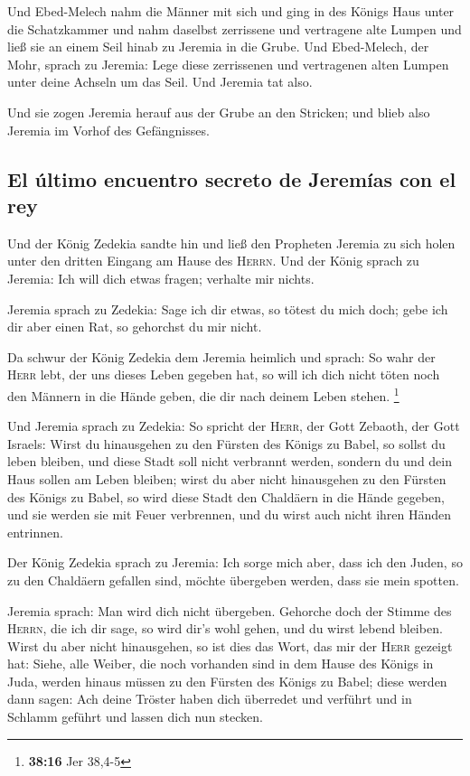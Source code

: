  Und Ebed-Melech nahm die Männer mit sich und ging in des
Königs Haus unter die Schatzkammer und nahm daselbst zerrissene und
vertragene alte Lumpen und ließ sie an einem Seil hinab zu Jeremia in
die Grube.  Und Ebed-Melech, der Mohr, sprach zu Jeremia:
Lege diese zerrissenen und vertragenen alten Lumpen unter deine Achseln
um das Seil. Und Jeremia tat also.

 Und sie zogen Jeremia herauf aus der Grube an den
Stricken; und blieb also Jeremia im Vorhof des Gefängnisses.

\hypertarget{el-uxfaltimo-encuentro-secreto-de-jeremuxedas-con-el-rey}{%
\subsection{El último encuentro secreto de Jeremías con el
rey}\label{el-uxfaltimo-encuentro-secreto-de-jeremuxedas-con-el-rey}}

 Und der König Zedekia sandte hin und ließ den Propheten
Jeremia zu sich holen unter den dritten Eingang am Hause des
\textsc{Herrn}. Und der König sprach zu Jeremia: Ich will dich etwas
fragen; verhalte mir nichts.

 Jeremia sprach zu Zedekia: Sage ich dir etwas, so tötest
du mich doch; gebe ich dir aber einen Rat, so gehorchst du mir nicht.

 Da schwur der König Zedekia dem Jeremia heimlich und
sprach: So wahr der \textsc{Herr} lebt, der uns dieses Leben gegeben
hat, so will ich dich nicht töten noch den Männern in die Hände geben,
die dir nach deinem Leben stehen. \footnote{\textbf{38:16} Jer 38,4-5}

 Und Jeremia sprach zu Zedekia: So spricht der
\textsc{Herr}, der Gott Zebaoth, der Gott Israels: Wirst du hinausgehen
zu den Fürsten des Königs zu Babel, so sollst du leben bleiben, und
diese Stadt soll nicht verbrannt werden, sondern du und dein Haus sollen
am Leben bleiben;  wirst du aber nicht hinausgehen zu den
Fürsten des Königs zu Babel, so wird diese Stadt den Chaldäern in die
Hände gegeben, und sie werden sie mit Feuer verbrennen, und du wirst
auch nicht ihren Händen entrinnen.

 Der König Zedekia sprach zu Jeremia: Ich sorge mich
aber, dass ich den Juden, so zu den Chaldäern gefallen sind, möchte
übergeben werden, dass sie mein spotten.

 Jeremia sprach: Man wird dich nicht übergeben. Gehorche
doch der Stimme des \textsc{Herrn}, die ich dir sage, so wird dir's wohl
gehen, und du wirst lebend bleiben.  Wirst du aber nicht
hinausgehen, so ist dies das Wort, das mir der \textsc{Herr} gezeigt
hat:  Siehe, alle Weiber, die noch vorhanden sind in dem
Hause des Königs in Juda, werden hinaus müssen zu den Fürsten des Königs
zu Babel; diese werden dann sagen: Ach deine Tröster haben dich
überredet und verführt und in Schlamm geführt und lassen dich nun
stecken.

